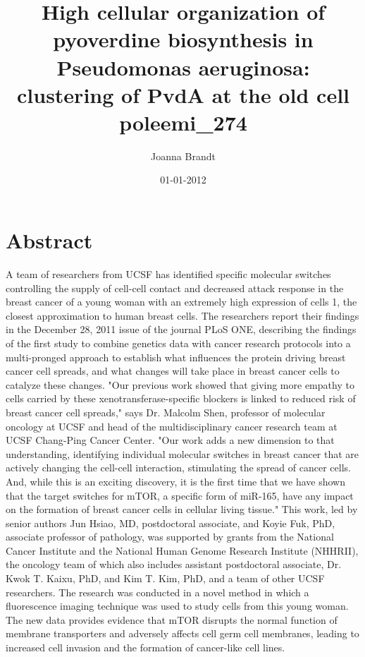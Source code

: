 \documentclass{article}%
\title{High cellular organization of pyoverdine biosynthesis in Pseudomonas aeruginosa: clustering of PvdA at the old cell poleemi\_274}%
\author{Joanna Brandt}%
\affil{Priority Research Centre for Cancer Research, University of Newcastle, Callaghan, NSW, Australia}%
\date{01{-}01{-}2012}%
\begin{document}
%
\normalsize%
\maketitle%
\section{Abstract}%
\label{sec:Abstract}%
A team of researchers from UCSF has identified specific molecular switches controlling the supply of cell{-}cell contact and decreased attack response in the breast cancer of a young woman with an extremely high expression of cells 1, the closest approximation to human breast cells.\newline%
The researchers report their findings in the December 28, 2011 issue of the journal PLoS ONE, describing the findings of the first study to combine genetics data with cancer research protocols into a multi{-}pronged approach to establish what influences the protein driving breast cancer cell spreads, and what changes will take place in breast cancer cells to catalyze these changes.\newline%
"Our previous work showed that giving more empathy to cells carried by these xenotransferase{-}specific blockers is linked to reduced risk of breast cancer cell spreads," says Dr. Malcolm Shen, professor of molecular oncology at UCSF and head of the multidisciplinary cancer research team at UCSF Chang{-}Ping Cancer Center. "Our work adds a new dimension to that understanding, identifying individual molecular switches in breast cancer that are actively changing the cell{-}cell interaction, stimulating the spread of cancer cells. And, while this is an exciting discovery, it is the first time that we have shown that the target switches for mTOR, a specific form of miR{-}165, have any impact on the formation of breast cancer cells in cellular living tissue."\newline%
This work, led by senior authors Jun Hsiao, MD, postdoctoral associate, and Koyie Fuk, PhD, associate professor of pathology, was supported by grants from the National Cancer Institute and the National Human Genome Research Institute (NHHRII), the oncology team of which also includes assistant postdoctoral associate, Dr. Kwok T. Kaixu, PhD, and Kim T. Kim, PhD, and a team of other UCSF researchers.\newline%
The research was conducted in a novel method in which a fluorescence imaging technique was used to study cells from this young woman. The new data provides evidence that mTOR disrupts the normal function of membrane transporters and adversely affects cell germ cell membranes, leading to increased cell invasion and the formation of cancer{-}like cell lines.\newline%
\end{document}

